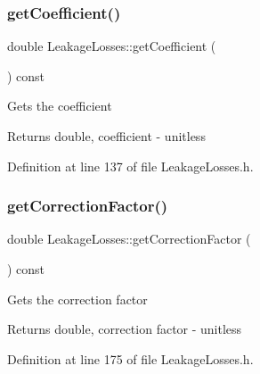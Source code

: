 \mbox{\label{class_leakage_losses_a7f70af7175574e0c4447a322586ac01e}} 
\subsubsection{\texorpdfstring{get\+Coefficient()}{getCoefficient()}}
{\footnotesize\ttfamily double Leakage\+Losses\+::get\+Coefficient (\begin{DoxyParamCaption}{ }\end{DoxyParamCaption}) const\hspace{0.3cm}{\ttfamily [inline]}}

Gets the coefficient

\begin{DoxyReturn}{Returns}
double, coefficient -\/ unitless 
\end{DoxyReturn}


Definition at line 137 of file Leakage\+Losses.\+h.

\mbox{\label{class_leakage_losses_ad4f289a7490cd3fd4dfc4099fc4ad562}} 
\subsubsection{\texorpdfstring{get\+Correction\+Factor()}{getCorrectionFactor()}}
{\footnotesize\ttfamily double Leakage\+Losses\+::get\+Correction\+Factor (\begin{DoxyParamCaption}{ }\end{DoxyParamCaption}) const\hspace{0.3cm}{\ttfamily [inline]}}

Gets the correction factor

\begin{DoxyReturn}{Returns}
double, correction factor -\/ unitless 
\end{DoxyReturn}


Definition at line 175 of file Leakage\+Losses.\+h.

\mbox{\label{class_leakage_losses_a0ec89fc6371c4a788e1bb861c7cfba35}} 
